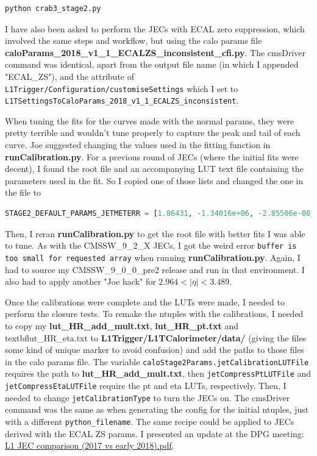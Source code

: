 \begin{lstlisting}[belowskip=-0.7cm, language=sh, numbers=none]
python crab3_stage2.py
\end{lstlisting}

I have also been asked to perform the JECs with ECAL zero suppression, which involved the same steps and workflow, but using the calo params file \textbf{caloParams\_2018\_v1\_1\_ECALZS\_inconsistent\_cfi.py}. The cmsDriver command was identical, apart from the output file name (in which I appended "ECAL\_ZS"), and the attribute of \texttt{L1Trigger/Configuration/customiseSettings} which I set to \texttt{L1TSettingsToCaloParams\_2018\_v1\_1\_ECALZS\_inconsistent}.

When tuning the fits for the curves made with the normal params, they were pretty terrible and wouldn't tune properly to capture the peak and tail of each curve. Joe suggested changing the values used in the fitting function in \textbf{runCalibration.py}. For a previous round of JECs (where the initial fits were decent), I found the root file and an accompanying LUT text file containing the parameters used in the fit. So I copied one of those lists and changed the one in the file to

\begin{lstlisting}[belowskip=-0.7cm, language=Python, numbers=none]
STAGE2_DEFAULT_PARAMS_JETMETERR = [1.86431, -1.34016e+06, -2.85506e-08, 20.2633, -6.40935e-07, -1.54, 1.06511]
\end{lstlisting}

Then, I reran \textbf{runCalibration.py} to get the root file with better fits I was able to tune. As with the CMSSW\_9\_2\_X JECs, I got the weird error \texttt{buffer is too small for requested array} when running \textbf{runCalibration.py}. Again, I had to source my CMSSW\_9\_0\_0\_pre2 release and run in that environment. I also had to apply another "Joe hack" for $2.964 < |\eta| < 3.489$.

Once the calibrations were complete and the LUTs were made, I needed to perform the closure tests. To remake the ntuples with the calibrations, I needed to copy my \textbf{lut\_HR\_add\_mult.txt}, \textbf{lut\_HR\_pt.txt} and textbf{lut\_HR\_eta.txt} to \textbf{L1Trigger/L1TCalorimeter/data/} (giving the files some kind of unique marker to avoid confusion) and add the paths to those files in the calo params file. The variable \texttt{caloStage2Params.jetCalibrationLUTFile} requires the path to \textbf{lut\_HR\_add\_mult.txt}, then \texttt{jetCompressPtLUTFile} and \texttt{jetCompressEtaLUTFile} require the pt and eta LUTs, respectively. Then, I needed to change \texttt{jetCalibrationType} to turn the JECs on. The cmsDriver command was the same as when generating the config for the initial ntuples, just with a different \texttt{python\_filename}. The same recipe could be applied to JECs derived with the ECAL ZS params. I presented an update at the DPG meeting: \href{run:./sec20/20180423 L1 JEC comparison (2017 vs early 2018).pdf}{L1 JEC comparison (2017 vs early 2018).pdf}.



